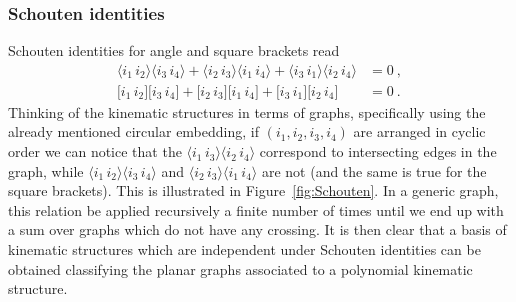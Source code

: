 \documentclass[aps,prd,nofootinbib,twocolumn,10pt]{revtex4-2}
\newcommand{\agl}[2]{\langle#1\, #2 \rangle}
\newcommand{\sqr}[2]{\lbrack #1\, #2 \rbrack}
\begin{document}
\subsubsection{Schouten identities}

Schouten identities for angle and square brackets read
\begin{equation}\label{eq:Schouten}
\begin{aligned}
    \agl{i_1}{i_2}\agl{i_3}{i_4} + \agl{i_2}{i_3}\agl{i_1}{i_4} + \agl{i_3}{i_1}\agl{i_2}{i_4} &= 0\ ,\\
    \sqr{i_1}{i_2}\sqr{i_3}{i_4} + \sqr{i_2}{i_3}\sqr{i_1}{i_4} + \sqr{i_3}{i_1}\sqr{i_2}{i_4} &= 0\ .
\end{aligned}
\end{equation}
Thinking of the kinematic structures in terms of graphs, specifically using the already mentioned circular embedding, if $(i_1,i_2,i_3,i_4)$ are arranged in cyclic order we can notice that the $\agl{i_1}{i_3}\agl{i_2}{i_4}$ correspond to intersecting edges in the graph, while $\agl{i_1}{i_2}\agl{i_3}{i_4}$ and $\agl{i_2}{i_3}\agl{i_1}{i_4}$ are not (and the same is true for the square brackets). This is illustrated in Figure~\ref{fig:Schouten}. In a generic graph, this relation be applied recursively a finite number of times until we end up with a sum over graphs which do not have any crossing. It is then clear that a basis of kinematic structures which are independent under Schouten identities can be obtained classifying the planar graphs associated to a polynomial kinematic structure.
\end{document}
